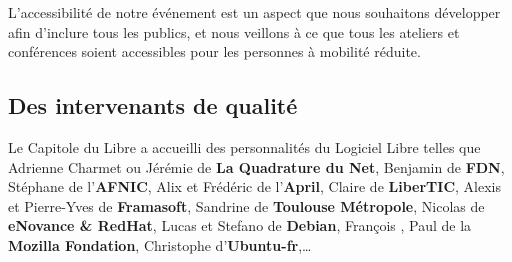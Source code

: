 \Separateur

L'accessibilité de notre événement est un aspect que nous souhaitons développer afin d'inclure tous les publics, et nous veillons à ce que tous les ateliers et conférences soient accessibles pour les personnes à mobilité réduite.

\subsection{Des intervenants de qualité}

Le Capitole du Libre a accueilli des personnalités du Logiciel Libre telles que Adrienne Charmet ou Jérémie  de \textbf{La Quadrature du Net}, Benjamin  de \textbf{FDN}, Stéphane  de l'\textbf{AFNIC}, Alix  et Frédéric  de l'\textbf{April}, Claire  de \textbf{LiberTIC}, Alexis  et Pierre-Yves  de \textbf{Framasoft}, Sandrine  de \textbf{Toulouse Métropole}, Nicolas  de \textbf{eNovance \& RedHat}, Lucas  et Stefano  de \textbf{Debian}, François , Paul  de la \textbf{Mozilla Fondation}, Christophe  d'\textbf{Ubuntu-fr},\dots
